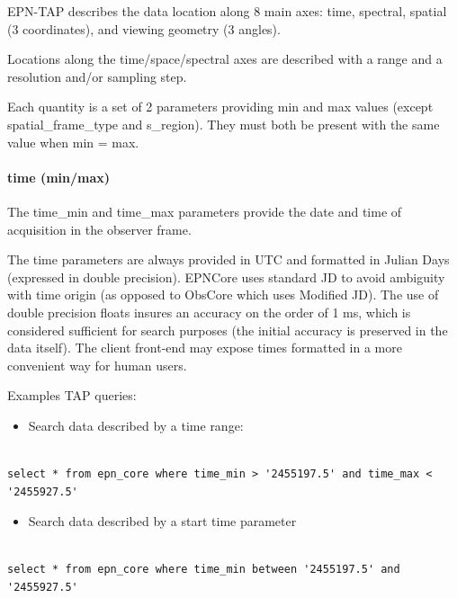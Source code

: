 \documentclass[11pt,a4paper]{ivoa}
\begin{document}
EPN-TAP describes the data location along 8 main axes: time, spectral, spatial (3 coordinates), and viewing geometry (3 angles). 

Locations along the time/space/spectral axes are described with a range and a resolution and/or sampling step. 

Each quantity is a set of 2 parameters providing min and max values (except spatial\_frame\_type and s\_region). They must both be present with the same value when min = max.

\paragraph{time (min/max)}

The time\_min and time\_max parameters provide the date and time of acquisition in the observer frame. 

The time parameters are always provided in UTC and formatted in Julian Days (expressed in double precision). EPNCore uses standard JD to avoid ambiguity with time origin (as opposed to ObsCore which uses Modified JD). The use of double precision floats insures an accuracy on the order of 1 ms, which is considered sufficient for search purposes (the initial accuracy is preserved in the data itself).  The client front-end may expose times formatted in a more convenient way for human users.

Examples TAP queries:

\begin{itemize}

\item Search data described by a time range:

\end{itemize}

\begin{verbatim}

select * from epn_core where time_min > '2455197.5' and time_max < '2455927.5'

\end{verbatim}

\begin{itemize}

\item Search data described by a start time parameter

\end{itemize}

\begin{verbatim}

select * from epn_core where time_min between '2455197.5' and '2455927.5'

\end{verbatim}
\end{document}
